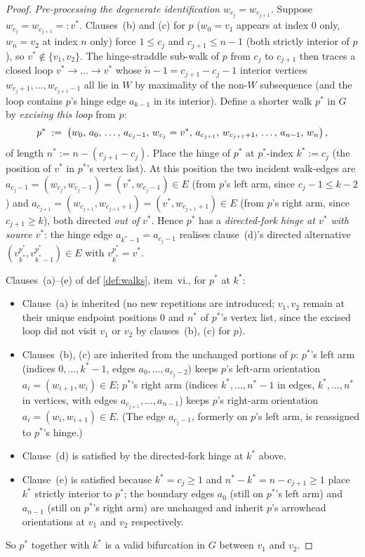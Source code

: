 \documentclass[main]{subfiles}
\begin{document}
\begin{proof}
\emph{Pre-processing the degenerate identification $w_{c_j} = w_{c_{j+1}}$.}
Suppose $w_{c_j} = w_{c_{j+1}} =: v^*$. Clauses~(b) and (c) for $p$
($w_0 = v_1$ appears at index $0$ only, $w_n = v_2$ at index $n$ only)
force $1 \le c_j$ and $c_{j+1} \le n - 1$ (both strictly interior of
$p$), so $v^* \notin \{v_1, v_2\}$. The hinge-straddle sub-walk of $p$
from $c_j$ to $c_{j+1}$ then traces a closed loop $v^* \to \dots \to v^*$
whose $\tilde n - 1 = c_{j+1} - c_j - 1$ interior vertices
$w_{c_j + 1}, \dots, w_{c_{j+1} - 1}$ all lie in $W$ by maximality of
the non-$W$ subsequence (and the loop contains $p$'s hinge edge
$a_{k - 1}$ in its interior). Define a shorter walk $p^*$ in $G$ by
\emph{excising this loop} from $p$:
\[
    p^* \;:=\; \left ( w_0,\, a_0,\, \dots,\, a_{c_j - 1},\, w_{c_j} = v^*,\, a_{c_{j+1}},\, w_{c_{j+1} + 1},\, \dots,\, a_{n - 1},\, w_n \right ),
\]
of length $n^* := n - (c_{j+1} - c_j)$. Place the hinge of $p^*$ at
$p^*$-index $k^* := c_j$ (the position of $v^*$ in $p^*$'s vertex list).
At this position the two incident walk-edges are
$a_{c_j - 1} = (w_{c_j}, w_{c_j - 1}) = (v^*, w_{c_j - 1}) \in E$ (from
$p$'s left arm, since $c_j - 1 \le k - 2$) and
$a_{c_{j+1}} = (w_{c_{j+1}}, w_{c_{j+1} + 1}) = (v^*, w_{c_{j+1} + 1}) \in E$
(from $p$'s right arm, since $c_{j+1} \ge k$), both directed \emph{out
of} $v^*$. Hence $p^*$ has a \emph{directed-fork hinge at $v^*$ with
source $v^*$}: the hinge edge $a_{k^* - 1} = a_{c_j - 1}$ realises
clause~(d)'s directed alternative
$(v_{k^*}^{p^*}, v_{k^* - 1}^{p^*}) \in E$ with $v_{k^*}^{p^*} = v^*$.

Clauses~(a)--(e) of def \ref{def:walks}, item~vi., for $p^*$ at $k^*$:
\begin{itemize}
    \item Clause~(a) is inherited (no new repetitions are introduced; $v_1, v_2$ remain at their unique endpoint positions $0$ and $n^*$ of $p^*$'s vertex list, since the excised loop did not visit $v_1$ or $v_2$ by clauses~(b), (c) for $p$).
    \item Clauses~(b), (c) are inherited from the unchanged portions of $p$: $p^*$'s left arm (indices $0, \dots, k^* - 1$, edges $a_0, \dots, a_{c_j - 2}$) keeps $p$'s left-arm orientation $a_i = (w_{i+1}, w_i) \in E$; $p^*$'s right arm (indices $k^*, \dots, n^* - 1$ in edges, $k^*, \dots, n^*$ in vertices, with edges $a_{c_{j+1}}, \dots, a_{n - 1}$) keeps $p$'s right-arm orientation $a_i = (w_i, w_{i+1}) \in E$. (The edge $a_{c_j - 1}$, formerly on $p$'s left arm, is reassigned to $p^*$'s hinge.)
    \item Clause~(d) is satisfied by the directed-fork hinge at $k^*$ above.
    \item Clause~(e) is satisfied because $k^* = c_j \ge 1$ and $n^* - k^* = n - c_{j+1} \ge 1$ place $k^*$ strictly interior to $p^*$; the boundary edges $a_0$ (still on $p^*$'s left arm) and $a_{n - 1}$ (still on $p^*$'s right arm) are unchanged and inherit $p$'s arrowhead orientations at $v_1$ and $v_2$ respectively.
\end{itemize}
So $p^*$ together with $k^*$ is a valid bifurcation in $G$ between $v_1$
and $v_2$.


\end{proof}
\end{document}
